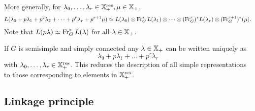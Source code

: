 		More generally, for $\lambda_0,\dots,\lambda_r\in \mathbb{X}_+^{\mathrm{res}},\mu\in \mathbb{X}_+$.
		\[
			L(\lambda_0+p\lambda_1+p^2\lambda_2+\dots+p^{r}\lambda_r + p^{r+1}\mu) \simeq
			L(\lambda_0)\otimes \operatorname{Fr}_G^{*}L(\lambda_1) \otimes\dots\otimes
			(\operatorname{Fr}_G^{r})^{*}L(\lambda_r)\otimes(\operatorname{Fr}_G^{r+1})^{*}(\mu).
		\]
		Note that $L(p\lambda)\simeq \operatorname{Fr}_G^{*}L(\lambda)$ for all $\lambda\in \mathbb{X}_+$.

		\begin{remark}
			If $G$ is semisimple and simply connected any $\lambda\in \mathbb{X}_+$ can be written uniquely as
			\[
				\lambda_0+p\lambda_1+\dots+p^{r}\lambda_r
			\]
			with $\lambda_0,\dots,\lambda_r\in \mathbb{X}_+^{\mathrm{res}}$. This reduces the description of all
			simple representations to those corresponding to elements in $\mathbb{X}_+^{\mathrm{res}}$.
		\end{remark}
		\subsection{Linkage principle}
